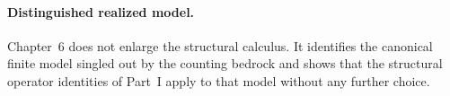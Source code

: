 \paragraph{Distinguished realized model.}
Chapter~6 does not enlarge the structural calculus. It identifies the canonical
finite model singled out by the counting bedrock and shows that the structural
operator identities of Part~I apply to that model without any further choice.

